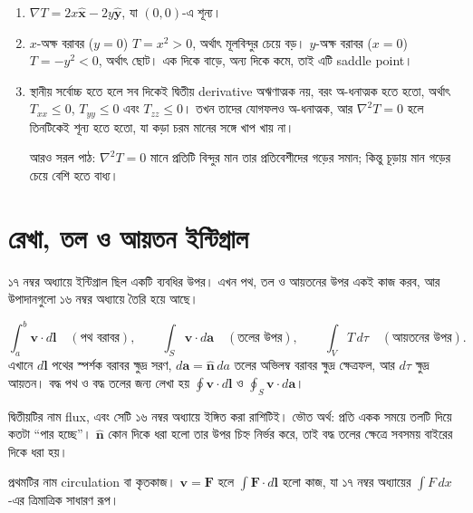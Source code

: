 \documentclass[11pt]{article}
\begin{document}
\begin{sol}
\begin{enumerate}
  \item $\nabla T = 2x\hat{\mathbf{x}} - 2y\hat{\mathbf{y}}$, যা $(0,0)$-এ
        শূন্য।
  \item $x$-অক্ষ বরাবর ($y=0$) $T = x^{2} > 0$, অর্থাৎ মূলবিন্দুর চেয়ে বড়।
        $y$-অক্ষ বরাবর ($x=0$) $T = -y^{2} < 0$, অর্থাৎ ছোট। এক দিকে বাড়ে,
        অন্য দিকে কমে, তাই এটি saddle point।
  \item স্থানীয় সর্বোচ্চ হতে হলে সব দিকেই দ্বিতীয় derivative অঋণাত্মক নয়,
        বরং অ-ধনাত্মক হতে হতো, অর্থাৎ $T_{xx} \leq 0$, $T_{yy} \leq 0$ এবং
        $T_{zz} \leq 0$। তখন তাদের যোগফলও অ-ধনাত্মক, আর $\nabla^{2}T = 0$
        হলে তিনটিকেই শূন্য হতে হতো, যা কড়া চরম মানের সঙ্গে খাপ খায় না।

        আরও সরল পাঠ: $\nabla^{2}T = 0$ মানে প্রতিটি বিন্দুর মান তার
        প্রতিবেশীদের গড়ের সমান; কিন্তু চূড়ায় মান গড়ের চেয়ে বেশি হতে বাধ্য।
\end{enumerate}
\end{sol}

\section{রেখা, তল ও আয়তন ইন্টিগ্রাল}

১৭ নম্বর অধ্যায়ে ইন্টিগ্রাল ছিল একটি ব্যবধির উপর। এখন পথ, তল ও আয়তনের
উপর একই কাজ করব, আর উপাদানগুলো ১৬ নম্বর অধ্যায়ে তৈরি হয়ে আছে।

\begin{idea}[তিন ধরনের ইন্টিগ্রাল]
\[
  \int_{a}^{b} \mathbf{v}\cdot d\mathbf{l}
  \quad (\text{পথ বরাবর}), \qquad
  \int_{S} \mathbf{v}\cdot d\mathbf{a}
  \quad (\text{তলের উপর}), \qquad
  \int_{V} T \, d\tau
  \quad (\text{আয়তনের উপর}) .
\]
এখানে $d\mathbf{l}$ পথের স্পর্শক বরাবর ক্ষুদ্র সরণ, $d\mathbf{a} =
\hat{\mathbf{n}}\,da$ তলের অভিলম্ব বরাবর ক্ষুদ্র ক্ষেত্রফল, আর $d\tau$
ক্ষুদ্র আয়তন। বদ্ধ পথ ও বদ্ধ তলের জন্য লেখা হয়
$\oint \mathbf{v}\cdot d\mathbf{l}$ ও
$\oint_{S}\mathbf{v}\cdot d\mathbf{a}$।
\end{idea}

দ্বিতীয়টির নাম flux, এবং সেটি ১৬ নম্বর অধ্যায়ে ইঙ্গিত করা রাশিটিই। ভৌত
অর্থ: প্রতি একক সময়ে তলটি দিয়ে কতটা ``পার হচ্ছে''। $\hat{\mathbf{n}}$ কোন
দিকে ধরা হলো তার উপর চিহ্ন নির্ভর করে, তাই বদ্ধ তলের ক্ষেত্রে সবসময় বাইরের
দিকে ধরা হয়।

প্রথমটির নাম circulation বা কৃতকাজ। $\mathbf{v} = \mathbf{F}$ হলে
$\int\mathbf{F}\cdot d\mathbf{l}$ হলো কাজ, যা ১৭ নম্বর অধ্যায়ের
$\int F\,dx$-এর ত্রিমাত্রিক সাধারণ রূপ।
\end{document}
